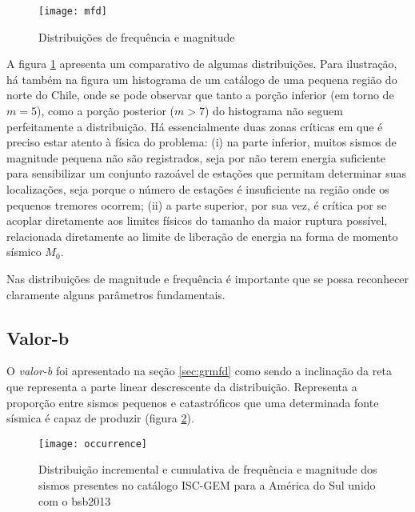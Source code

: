 \begin{figure}[H]
   \centering
   \texttt{[image: mfd]}
   \caption[Distribuições de frequência e magnitude]
   		   {Distribuições de frequência e magnitude}
   \label{f:mfd}
\end{figure}

A figura \ref{f:mfd} apresenta um comparativo de algumas distribuições. Para ilustração,
há também na figura um histograma de um catálogo de
uma pequena região do norte do Chile, onde se pode observar que tanto a porção inferior (em torno de $m=5$), como a porção
posterior ($m > 7$) do histograma não seguem perfeitamente a distribuição. Há essencialmente duas zonas críticas em que é preciso
estar atento à física do problema:
(i) na parte inferior, muitos sismos de magnitude pequena não são registrados, seja por não terem energia suficiente
para sensibilizar um conjunto razoável de estações que permitam determinar suas localizações, seja porque o número de
estações é insuficiente na região onde os pequenos tremores ocorrem; (ii) a parte superior, por sua vez, é crítica
por se acoplar diretamente aos limites físicos do tamanho da maior ruptura possível, relacionada diretamente ao limite de liberação de energia na forma de momento sísmico $M_0$.

Nas distribuições de magnitude e frequência é importante que se possa reconhecer claramente alguns parâmetros
fundamentais.

\subsection{Valor-b}
\label{sec:b_value}

O \emph{valor-b} foi apresentado na seção \ref{sec:grmfd} como sendo a inclinação da reta que representa a parte linear
descrescente da distribuição. Representa a proporção entre sismos pequenos e catastróficos que uma determinada fonte
sísmica é capaz de produzir (figura \ref{f:occurrence}).

\begin{figure}[H]
   \centering
   \texttt{[image: occurrence]}
   \caption[Distribuição incremental e cumulativa de frequência e magnitude dos sismos presentes no catálogo ISC-GEM
   para a América do Sul unido com o \gls{bsb2013}]
   {Distribuição incremental e cumulativa de frequência e magnitude dos sismos presentes no catálogo ISC-GEM
   para a América do Sul unido com o \gls{bsb2013}}
   \label{f:occurrence}
\end{figure}




